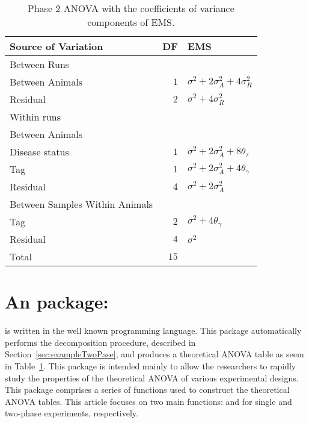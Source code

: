 \documentclass[article]{jss}
\begin{document}
\begin{table}[ht]
\centering
\caption{Phase 2 ANOVA with the coefficients of variance components of EMS.}
\begin{tabular}[t]{lrl}
\toprule
\multicolumn{1}{l}{\textbf{Source of Variation}} & \multicolumn{1}{l}{\textbf{DF}} & \multicolumn{1}{l}{\textbf{EMS}}\\
\midrule
Between Runs 		\\
\quad Between Animals & $1$ 	& $\sigma^2 + 2\sigma_{A}^2 + 4\sigma_{R}^2$\\
\quad Residual		& $2$ 	& $\sigma^2 + 4\sigma_{R}^2$\\
\hline
Within runs 				\\
\quad Between Animals \\
\quad\quad Disease status  & $1$ 	& $\sigma^2 + 2\sigma_{A}^2 + 8\theta_{\tau}$\\
\quad\quad Tag				& $1$ 	& $\sigma^2 + 2\sigma_{A}^2 + 4\theta_{\gamma}$\\
\quad\quad Residual		& $4$ 	& $\sigma^2 + 2\sigma_{A}^2$\\\hline
\quad Between Samples Within Animals		&\\
\quad\quad Tag				& $2$ 	& $\sigma^2 + 4\theta_{\gamma}$\\
\quad\quad Residual		& $4$ 	& $\sigma^2$\\
\hline
Total 						& $15$      & \\
\bottomrule
\end{tabular}
\label{tab:Phase2ANOVA}
\end{table}


\section[InfoDecompuTE]{An  package: } \label{sec:package}
 is written in the well known  programming language. This package automatically performs the decomposition procedure, described in Section~\ref{sec:exampleTwoPase}, and produces a theoretical ANOVA table as seem in Table~\ref{tab:Phase2ANOVA}. This package is intended mainly to allow the researchers to rapidly study the properties of the theoretical ANOVA of various experimental designs. This package comprises a series of functions used to construct the theoretical ANOVA tables. This article focuses on two main functions:  and  for single and two-phase experiments, respectively. 
\end{document}

